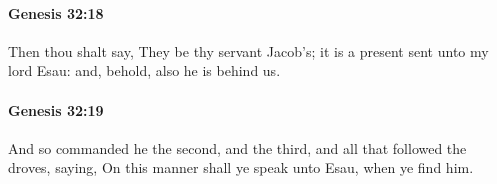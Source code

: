 		\paragraph{Genesis 32:18} %
			\label{GENESIS-32-18}

			Then thou shalt say, They be thy servant Jacob's; it is a present sent unto my lord Esau: and, behold, also he is behind us.


		\paragraph{Genesis 32:19} %
			\label{GENESIS-32-19}

			And so commanded he the second, and the third, and all that followed the droves, saying, On this manner shall ye speak unto Esau, when ye find him.


